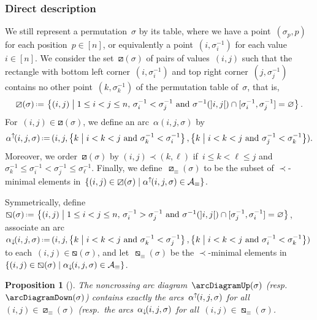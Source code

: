 \documentclass{amsart}
\newtheorem{proposition}[theorem]{Proposition}
\theoremstyle{definition}
\newcommand{\set}[2]{\left\{ #1 \;\middle|\; #2 \right\}} %
\newcommand{\eqdef}{\mbox{\,\raisebox{0.2ex}{\scriptsize\ensuremath{\mathrm:}}\ensuremath{=}\,}} %
\newcommand{\Vincent}[1]{\todo[color=blue!30,inline]{#1 \\ \hfill --- V.}}
\newcommand{\arcs}{{\mathcal{A}}} %
\newcommand{\arcDown}{\smash{\alpha_{\downarrow\!}}} %
\newcommand{\arcUp}{\smash{\alpha^{\uparrow\!}}} %
\begin{document}
\subsubsection{Direct description}


We still represent a permutation~$\sigma$ by its table, where we have a point~$(\sigma_p, p)$ for each position~$p \in [n]$, or equivalently a point~$(i, \sigma^{-1}_i)$ for each value~$i \in [n]$.
We consider the set~$\boxslash(\sigma)$ of pairs of values~$(i,j)$ such that the rectangle with bottom left corner~$(i, \sigma^{-1}_i)$ and top right corner~$(j, \sigma^{-1}_j)$ contains no other point~$(k, \sigma^{-1}_k)$ of the permutation table of~$\sigma$, that is,
\[
\boxslash(\sigma) \eqdef \set{(i, j)}{1 \le i < j \le n, \, \sigma^{-1}_i < \sigma^{-1}_j \text{ and } \sigma^{-1}(]i, j[) \cap {[\sigma^{-1}_i, \sigma^{-1}_j]} = \varnothing}.
\]
For~$(i, j) \in \boxslash(\sigma)$, we define an arc~$\alpha(i, j, \sigma)$ by
\[
\arcUp(i, j, \sigma) \eqdef (i, j, \set{k}{i < k < j \text{ and } \sigma^{-1}_k < \sigma^{-1}_i}, \set{k}{i < k < j \text{ and } \sigma^{-1}_j < \sigma^{-1}_k}).
\]
Moreover, we order~$\boxslash(\sigma)$ by $(i, j) \prec (k,\ell)$ if~$i \le k < \ell \le j$ and~$\sigma^{-1}_k \le \sigma^{-1}_i < \sigma^{-1}_j \le \sigma^{-1}_\ell$.
Finally, we define~$\boxslash_\equiv(\sigma)$ to be the subset of $\prec$-minimal elements in~$\set{(i, j) \in \boxslash(\sigma)}{\arcUp(i, j, \sigma) \in \arcs_\equiv}$.

Symmetrically, define~$\boxbslash(\sigma) \eqdef \set{(i, j)}{1 \le i < j \le n, \, \sigma^{-1}_i > \sigma^{-1}_j \text{ and } \sigma^{-1}({]i,j[}) \cap {[\sigma^{-1}_j, \sigma^{-1}_i]} = \varnothing}$, associate an arc~$\arcDown(i, j, \sigma) \eqdef (i, j, \set{k}{i < k < j \text{ and } \sigma^{-1}_k < \sigma^{-1}_j}, \set{k}{i < k < j \text{ and } \sigma^{-1}_i < \sigma^{-1}_k})$ to each~${(i,j) \in \boxbslash(\sigma)}$, and let~$\boxbslash_\equiv(\sigma)$ be the $\prec$-minimal elements in~$\set{(i, j) \in \boxbslash(\sigma)}{\arcDown(i, j, \sigma) \in \arcs_\equiv}$.

\begin{proposition}[{\cite[Sect.~2.4]{Pilaud-arcDiagramAlgebra}}]
\label{prop:insertionMap}
The noncrossing arc diagram~$\arcDiagramUp(\sigma)$ (resp.~$\arcDiagramDown(\sigma)$) contains exactly the arcs~$\arcUp(i,j,\sigma)$ for all~$(i,j) \in \boxslash_\equiv(\sigma)$ (resp.~the arcs~$\arcDown(i,j,\sigma)$ for all~$(i,j) \in \boxbslash_\equiv(\sigma)$.
\end{proposition}
\end{document}
